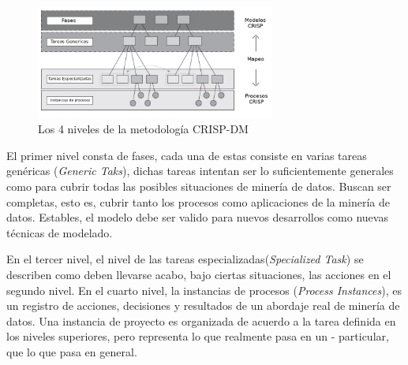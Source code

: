 \begin{figure}[H]
    \centering
    \includegraphics[width=0.7\textwidth]{Figuras/niveles_crisp.png}
    \caption{Los 4 niveles de la metodología CRISP-DM}
    \label{fig:crispniveles}
\end{figure} 

El primer nivel consta de fases, cada una de estas consiste en varias tareas genéricas (\emph{Generic Taks}), dichas tareas intentan ser lo suficientemente generales como para cubrir todas las posibles situaciones de minería de datos. Buscan ser completas, esto es, cubrir tanto los procesos como aplicaciones de la minería de datos. Estables, el modelo debe ser valido para nuevos desarrollos como nuevas técnicas de modelado.\cite{chapman2000crisp}

En el tercer nivel, el nivel de las tareas especializadas(\emph{Specialized Task}) se describen como deben llevarse acabo, bajo ciertas situaciones, las acciones en el segundo nivel. En el cuarto nivel, la instancias de procesos (\emph{Process Instances}), es un registro de acciones, decisiones y resultados de un abordaje real de minería de datos. Una instancia de proyecto es organizada de acuerdo a la tarea definida en los niveles superiores, pero representa lo que realmente pasa en un - particular, que lo que pasa en general.\cite{chapman2000crisp}


